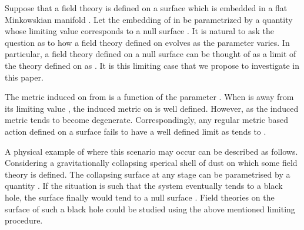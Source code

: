 \documentclass[a4paper,12pt]{article}
\begin{document}
Suppose that a field theory is defined on a surface \coordHE{} which is embedded in
a flat Minkowskian manifold \coordHE{}.
Let the embedding of \coordHE{} in \coordHE{} be parametrized by a quantity
\coordHE{}
whose limiting value \coordHE{} corresponds to a null surface
 \coordHE{} .  It is natural to ask the question as to how a field theory 
defined on \coordHE{} evolves as the parameter \coordHE{} varies. In particular,
a field theory defined  on a null surface \coordHE{} can be 
thought of as a limit of the theory defined on \coordHE{} as 
\coordHE{}. It is this limiting case that we propose
to investigate in this paper.

The metric \coordHE{} induced on \coordHE{} from \coordHE{} is a function of 
the parameter \coordHE{}. When \coordHE{} is
away from its limiting value \coordHE{}, 
the induced metric on \coordHE{} is well defined.
However, as \coordHE{}
the induced metric \coordHE{} tends to become degenerate. 
Correspondingly, any regular metric based action
defined on a surface \coordHE{} fails to have a well defined limit
as \coordHE{} tends to \coordHE{} . 

A physical example of where this scenario may occur 
can be described as follows.
Considering a gravitationally collapsing sperical shell \coordHE{} 
of dust on which some field theory
is defined. The collapsing surface \coordHE{} at any stage can be parametrised by 
a quantity \coordHE{}. If the situation is such that the system eventually
tends to a black hole, the surface \coordHE{} finally would tend to a null surface
\coordHE{}. Field theories on the surface of such a black hole could be studied
using the above mentioned limiting procedure. 
\end{document}

